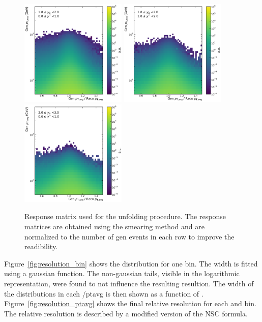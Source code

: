 \begin{figure}[htbp]
    \includegraphics[width=0.45\textwidth]{figures/measurement/gen_vs_reco_vs_gen_ptavg_yb1ys0.pdf}
    \includegraphics[width=0.45\textwidth]{figures/measurement/gen_vs_reco_vs_gen_ptavg_yb1ys1.pdf}\hfill
    \includegraphics[width=0.45\textwidth]{figures/measurement/gen_vs_reco_vs_gen_ptavg_yb2ys0.pdf}
    \caption{Response matrix used for the unfolding procedure. The response matrices are obtained
            using the smearing method and are normalized to the number of gen events in each row to improve
            the readibility.}
    \label{fig:gen_vs_reco_over_gen}
\end{figure}

Figure~\ref{fig:resolution_bin} shows the distribution for one \ptavg bin. The
width is fitted using a gaussian function. The non-gaussian tails, visible in
the logarithmic representation, were found to not influence the resulting
resultion. The width of the distributions in each /ptavg is then shown as a
function of \ptavg. Figure~\ref{fig:resolution_ptavg} shows the final relative
resolution for each \ystar and \yboost bin. The relative resolution is described
by a modified version of the NSC formula.

